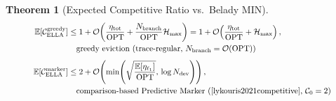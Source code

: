 \documentclass[conference,10pt]{IEEEtran}
\newtheorem{theorem}{Theorem}
\begin{document}
\begin{theorem}[Expected Competitive Ratio vs.\ Belady MIN]
\begin{equation}
\label{eq:comp_ratio}
\resizebox{0.88\columnwidth}{!}{$\displaystyle
\begin{aligned}
\mathbb{E}[\mathcal{C}_{\text{ELLA}}^{\text{greedy}}] &\le 1 + \mathcal{O}\!\left(\dfrac{\eta_{\text{tot}}}{\text{OPT}} + \dfrac{N_{\text{branch}}}{\text{OPT}}\mathcal{H}_{\max}\right) = 1 + \mathcal{O}\!\left(\dfrac{\eta_{\text{tot}}}{\text{OPT}} + \mathcal{H}_{\max}\right), \\[-1pt]
&\quad \text{greedy eviction (trace-regular, } N_{\text{branch}} = \mathcal{O}(\text{OPT})\text{)} \\[4pt]
\mathbb{E}[\mathcal{C}_{\text{ELLA}}^{\text{marker}}] &\le 2 + \mathcal{O}\!\left(\min\!\left(\sqrt{\dfrac{\mathbb{E}[\eta_{\ell_1}]}{\text{OPT}}},\, \log N_{\text{dev}}\right)\right), \\[-1pt]
&\quad \text{comparison-based Predictive Marker (\cite{lykouris2021competitive}, }\mathcal{C}_0 = 2\text{)}
\end{aligned}
$}
\end{equation}
\end{theorem}
\end{document}
